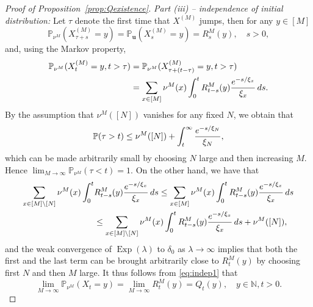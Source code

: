 \documentclass[11pt,a4paper]{scrartcl}
\numberwithin{equation}{section}
\theoremstyle{plain}
\theoremstyle{definition}
\theoremstyle{remark}
\newcommand{\bE}{\ensuremath{\mathbb{E}}}
\newcommand{\bN}{\ensuremath{\mathbb{N}}}
\newcommand{\bP}{\ensuremath{\mathbb{P}}}
\newcommand{\di}{\,\textup{d}}
\newcommand{\bPu}{\bP_\mathbf{u}}
\begin{document}
\begin{proof}[Proof of Proposition~\ref{prop:Qexistence}]
\noindent\textit{Part (iii) -- independence of initial distribution:} Let $\tau$ denote the first time that ${X}^{(M)}$ jumps, then for any $y\in [M]$
$$
\bP_{\nu^M}({X}^{(M)}_{\tau+s}=y)=\bP_{\mathbf{u}}({X}^{(M)}_{s}=y)=R_s^M(y), \quad s>0,
$$
and, using the Markov property,
\begin{align}\label{eq:indep1}\bP_{\nu^M}({X}^{(M)}_{t}=y, t>\tau) & =\bP_{\nu^M}({X}^{(M)}_{\tau+(t-\tau)}=y,t>\tau)\\
	& =\sum_{x\in[M]}\nu^M(x)\int_{0}^t R_{t-s}^M(y) \frac{\textup{e}^{-s/\xi_x}}{\xi_x}\di s.
\end{align}
By the assumption that $\nu^M([N])$ vanishes for any fixed $N$, we obtain that $$\bP(\tau>t)\leq \nu^M([N])+\int_t^\infty \frac{\textup{e}^{-s/\xi_N}}{\xi_N},$$
which can be made arbitrarily small by choosing $N$ large and then increasing $M$. Hence $\lim_{M\to\infty}\bP_{\nu^M}(\tau<t)=1$. On the other hand, we have that
\begin{align*}\sum_{x\in[M]\setminus[N]}\nu^M(x)\int_{0}^t & R_{t-s}^M(y) \frac{\textup{e}^{-s/\xi_x}}{\xi_x}\di s    \leq \sum_{x\in[M]}\nu^M(x)\int_{0}^t R_{t-s}^M(y) \frac{\textup{e}^{-s/\xi_x}}{\xi_x}\di s\\
	&  \leq \sum_{x\in[M]\setminus[N]}\nu^M(x)\int_{0}^t R_{t-s}^M(y) \frac{\textup{e}^{-s/\xi_x}}{\xi_x}\di s+ \nu^M([N]),
\end{align*}
 and the weak convergence of $\operatorname{Exp}(\lambda)$ to $\delta_0$ as $\lambda\to\infty$ implies that both the first and the last term can be brought arbitrarily close to $R_t^M(y)$ by choosing first $N$ and then $M$ large. It thus follows from \eqref{eq:indep1} that
 $$\lim_{M\to\infty}\bP_{\nu^M}(X_t = y)=\lim_{M\to\infty}R_t^M(y)=Q_t(y),\quad y\in \bN, t>0.$$
\end{proof}
\end{document}
